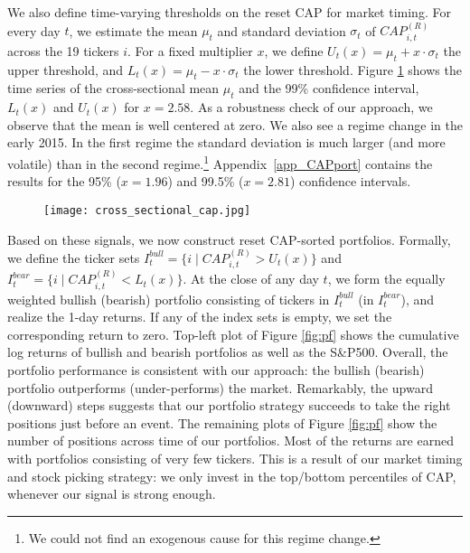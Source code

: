 We also define time-varying thresholds on the reset CAP for market timing. For every day $t$, we estimate the mean $\mu_t$ and standard deviation $\sigma_t$ of $CAP_{i,t}^{(R)}$ across the 19 tickers $i$. For a fixed multiplier $x$, we define $U_t(x) = \mu_t + x \cdot \sigma_t$ the upper threshold, and $L_t(x) = \mu_t - x \cdot \sigma_t$ the lower threshold. Figure \ref{fig:cross-sec stats} shows the time series of the cross-sectional mean $\mu_t$ and the 99\% confidence interval, $L_t(x)$ and $U_t(x)$ for $x = 2.58$. As a robustness check of our approach, we observe that the mean is well centered at zero. We also see a regime change in the early 2015. In the first regime the standard deviation is much larger (and more volatile) than in the second regime.\footnote{We could not find an exogenous cause for this regime change.} Appendix~\ref{app_CAPport} contains the results for the 95\% ($x = 1.96$) and 99.5\% ($x = 2.81$) confidence intervals. 

\begin{figure}[h]
    \centering
    \texttt{[image: cross\_sectional\_cap.jpg]}
    \label{fig:cross-sec stats}
\end{figure}

Based on these signals, we now construct reset CAP-sorted portfolios. Formally, we define the ticker sets $I^{bull}_t=\{ i\mid CAP_{i,t}^{(R)} > U_t(x)\}$ and $I^{bear}_t=\{ i\mid CAP_{i,t}^{(R)} < L_t(x)\}$. At the close of any day $t$, we form the equally weighted bullish (bearish) portfolio consisting of tickers in $I^{bull}_t$ (in $I^{bear}_t$), and realize the 1-day returns. If any of the index sets is empty, we set the corresponding return to zero. Top-left plot of Figure \ref{fig:pf} shows the cumulative log returns of bullish and bearish portfolios as well as the S\&P500. Overall, the portfolio performance is consistent with our approach: the bullish (bearish) portfolio outperforms (under-performs) the market. Remarkably, the upward (downward) steps suggests that our portfolio strategy succeeds to take the right positions just before an event. The remaining plots of Figure \ref{fig:pf} show the number of positions across time of our portfolios. Most of the returns are earned with portfolios consisting of very few tickers. This is a result of our market timing and stock picking strategy: we only invest in the top/bottom percentiles of CAP, whenever our signal is strong enough.


